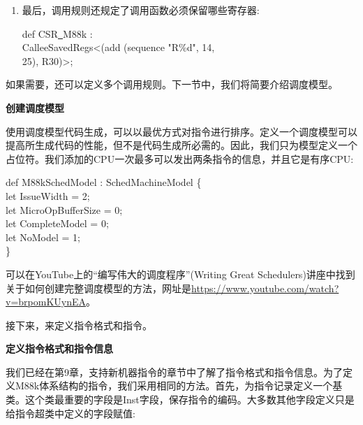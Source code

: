 \begin{enumerate}
\item 最后，调用规则还规定了调用函数必须保留哪些寄存器:
\begin{tcolorbox}[colback=white,colframe=black]
def CSR\underline{~}M88k : \\
\hspace*{1.5cm}CalleeSavedRegs<(add (sequence "R\%d", 14, \\
\hspace*{2cm}25), R30)>;
\end{tcolorbox}

\end{enumerate}

如果需要，还可以定义多个调用规则。下一节中，我们将简要介绍调度模型。\par


\hspace*{\fill} \par %
\textbf{创建调度模型}

使用调度模型代码生成，可以以最优方式对指令进行排序。定义一个调度模型可以提高所生成代码的性能，但不是代码生成所必需的。因此，我们只为模型定义一个占位符。我们添加的CPU一次最多可以发出两条指令的信息，并且它是有序CPU:\par

\begin{tcolorbox}[colback=white,colframe=black]
def M88kSchedModel : SchedMachineModel \{ \\
\hspace*{1cm}let IssueWidth = 2; \\
\hspace*{1cm}let MicroOpBufferSize = 0; \\
\hspace*{1cm}let CompleteModel = 0; \\
\hspace*{1cm}let NoModel = 1; \\
\}
\end{tcolorbox}

可以在YouTube上的“编写伟大的调度程序”(Writing Great Schedulers)讲座中找到关于如何创建完整调度模型的方法，网址是\url{https://www.youtube.com/watch?v=brpomKUynEA}。\par

接下来，来定义指令格式和指令。\par

\hspace*{\fill} \par %
\textbf{定义指令格式和指令信息}

我们已经在第9章，支持新机器指令的章节中了解了指令格式和指令信息。为了定义M88k体系结构的指令，我们采用相同的方法。首先，为指令记录定义一个基类。这个类最重要的字段是Inst字段，保存指令的编码。大多数其他字段定义只是给指令超类中定义的字段赋值:\par

